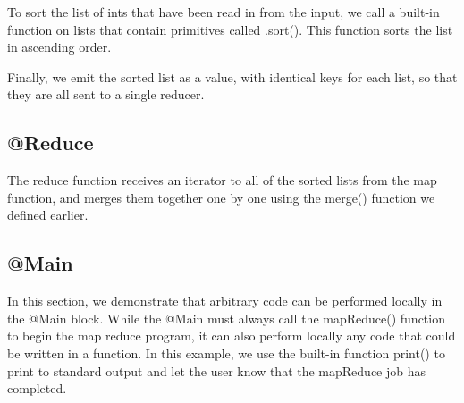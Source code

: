 \documentclass{article}
\begin{document}
To sort the list of ints that have been read in from the input, we call a built-in function on lists that contain primitives called .sort(). This function sorts the list in ascending order.

Finally, we emit the sorted list as a value, with identical keys for each list, so that they are all sent to a single reducer.

\subsection*{@Reduce}
The reduce function receives an iterator to all of the sorted lists from the map function, and merges them together one by one using the merge() function we defined earlier.

\subsection*{@Main}
In this section, we demonstrate that arbitrary code can be performed locally in the @Main block. While the @Main must always call the mapReduce() function to begin the map reduce program, it can also perform locally any code that could be written in a function. In this example, we use the built-in function print() to print to standard output and let the user know that the mapReduce job has completed.
\end{document}
